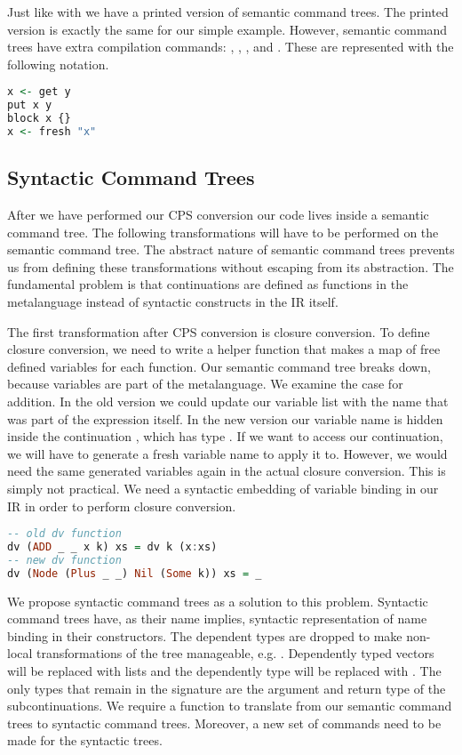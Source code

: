 Just like with  we have a printed version of semantic command trees. The printed version is exactly the same for our simple example. However, semantic command trees have extra compilation commands: , , , and . These are represented with the following notation.

\begin{lstlisting}[language=Haskell]
x <- get y
put x y
block x {}
x <- fresh "x"
\end{lstlisting}

\subsection{\label{subsection:syntree}Syntactic Command Trees}
After we have performed our \ac{CPS} conversion our code lives inside a semantic command tree. The following transformations will have to be performed on the semantic command tree. The abstract nature of semantic command trees prevents us from defining these transformations without escaping from its abstraction. The fundamental problem is that continuations are defined as functions in the metalanguage instead of syntactic constructs in the \ac{IR} itself.

The first transformation after \ac{CPS} conversion is closure conversion. To define closure conversion, we need to write a helper function  that makes a map of free defined variables for each function. Our semantic command tree breaks down, because variables are part of the metalanguage. We examine the case for addition. In the old version we could update our variable list with the name  that was part of the  expression itself. In the new version our variable name is hidden inside the continuation , which has type . If we want to access our continuation, we will have to generate a fresh variable name to apply it to. However, we would need the same generated variables again in the actual closure conversion. This is simply not practical. We need a syntactic embedding of variable binding in our \ac{IR} in order to perform closure conversion.

\begin{lstlisting}[language=Haskell]
-- old dv function
dv (ADD _ _ x k) xs = dv k (x:xs)
-- new dv function
dv (Node (Plus _ _) Nil (Some k)) xs = _
\end{lstlisting}

We propose syntactic command trees as a solution to this problem. Syntactic command trees have, as their name implies, syntactic representation of name binding in their constructors. The dependent types are dropped to make non-local transformations of the tree manageable, e.g. . Dependently typed vectors will be replaced with lists and the dependently type  will be replaced with . The only types that remain in the signature are the argument  and return type  of the subcontinuations. We require a function to translate from our semantic command trees to syntactic command trees. Moreover, a new set of commands need to be made for the syntactic trees.

